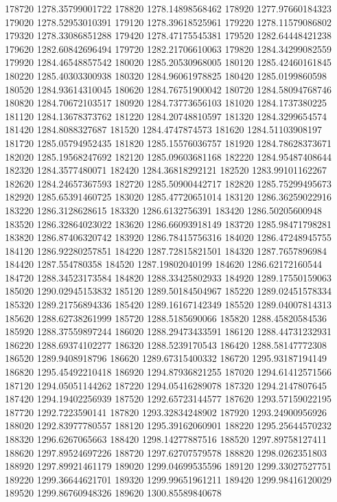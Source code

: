 {178720 1278.35799001722
178820 1278.14898568462
178920 1277.97660184323
179020 1278.52953010391
179120 1278.39618525961
179220 1278.11579086802
179320 1278.33086851288
179420 1278.47175545381
179520 1282.64448421238
179620 1282.60842696494
179720 1282.21706610063
179820 1284.34299082559
179920 1284.46548857542
180020 1285.20530968005
180120 1285.42460161845
180220 1285.40303300938
180320 1284.96061978825
180420 1285.0199860598
180520 1284.93614310045
180620 1284.76751900042
180720 1284.58094768746
180820 1284.70672103517
180920 1284.73773656103
181020 1284.1737380225
181120 1284.13678373762
181220 1284.20748810597
181320 1284.3299654574
181420 1284.8088327687
181520 1284.4747874573
181620 1284.51103908197
181720 1285.05794952435
181820 1285.15576036757
181920 1284.78628373671
182020 1285.19568247692
182120 1285.09603681168
182220 1284.95487408644
182320 1284.3577480071
182420 1284.36818292121
182520 1283.99101162267
182620 1284.24657367593
182720 1285.50900442717
182820 1285.75299495673
182920 1285.65391460725
183020 1285.47720651014
183120 1286.36259022916
183220 1286.3128628615
183320 1286.6132756391
183420 1286.50205600948
183520 1286.32864023022
183620 1286.66093918149
183720 1285.98471798281
183820 1286.87406320742
183920 1286.78415756316
184020 1286.47248945755
184120 1286.92280257851
184220 1287.72815821501
184320 1287.7657896984
184420 1287.554780358
184520 1287.19802040199
184620 1286.62172160544
184720 1288.34523173584
184820 1288.33425802933
184920 1289.17550159063
185020 1290.02945153832
185120 1289.50184504967
185220 1289.02451578334
185320 1289.21756894336
185420 1289.16167142349
185520 1289.04007814313
185620 1288.62738261999
185720 1288.5185690066
185820 1288.45820584536
185920 1288.37559897244
186020 1288.29473433591
186120 1288.44731232931
186220 1288.69374102277
186320 1288.5239170543
186420 1288.58147772308
186520 1289.9408918796
186620 1289.67315400332
186720 1295.93187194149
186820 1295.45492210418
186920 1294.87936821255
187020 1294.61412571566
187120 1294.05051144262
187220 1294.05416289078
187320 1294.2147807645
187420 1294.19402256939
187520 1292.65723144577
187620 1293.57159022195
187720 1292.7223590141
187820 1293.32834248902
187920 1293.24900956926
188020 1292.83977780557
188120 1295.39162060901
188220 1295.25644570232
188320 1296.6267065663
188420 1298.14277887516
188520 1297.89758127411
188620 1297.89524697226
188720 1297.62707579578
188820 1298.0262351803
188920 1297.89921461179
189020 1299.04699535596
189120 1299.33027527751
189220 1299.36644621701
189320 1299.99651961211
189420 1299.98416120029
189520 1299.86760948326
189620 1300.85589840678
}
